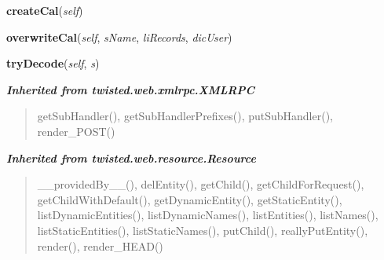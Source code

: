     \vspace{0.5ex}

\hspace{.8\funcindent}\begin{boxedminipage}{\funcwidth}

    \raggedright \textbf{createCal}(\textit{self})

\setlength{\parskip}{2ex}
\setlength{\parskip}{1ex}
    \end{boxedminipage}

    \label{cuon:iCal:iCal:overwriteCal}

    \vspace{0.5ex}

\hspace{.8\funcindent}\begin{boxedminipage}{\funcwidth}

    \raggedright \textbf{overwriteCal}(\textit{self}, \textit{sName}, \textit{liRecords}, \textit{dicUser})

\setlength{\parskip}{2ex}
\setlength{\parskip}{1ex}
    \end{boxedminipage}

    \label{cuon:iCal:iCal:tryDecode}

    \vspace{0.5ex}

\hspace{.8\funcindent}\begin{boxedminipage}{\funcwidth}

    \raggedright \textbf{tryDecode}(\textit{self}, \textit{s})

\setlength{\parskip}{2ex}
\setlength{\parskip}{1ex}
    \end{boxedminipage}


\large{\textbf{\textit{Inherited from twisted.web.xmlrpc.XMLRPC}}}

\begin{quote}
getSubHandler(), getSubHandlerPrefixes(), putSubHandler(), render\_POST()
\end{quote}

\large{\textbf{\textit{Inherited from twisted.web.resource.Resource}}}

\begin{quote}
\_\_providedBy\_\_(), delEntity(), getChild(), getChildForRequest(), getChildWithDefault(), getDynamicEntity(), getStaticEntity(), listDynamicEntities(), listDynamicNames(), listEntities(), listNames(), listStaticEntities(), listStaticNames(), putChild(), reallyPutEntity(), render(), render\_HEAD()
\end{quote}

